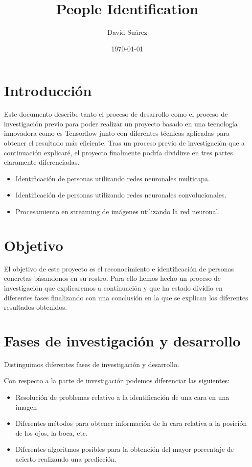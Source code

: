\documentclass{article}
\title{People Identification}
\author{David Suárez}
\date{\today}
\begin{document}
\maketitle

\section{Introducción}
Este documento describe tanto el proceso de desarrollo como el proceso de investigación previo para poder realizar un proyecto basado en una tecnología innovadora como es Tensorflow junto con diferentes técnicas aplicadas para obtener el resultado más eficiente.
Tras un proceso previo de investigación que a continuación explicaré, el proyecto finalmente podría dividirse en tres partes claramente diferenciadas.
\begin{itemize}
\item Identificación de personas utilizando redes neuronales multicapa.
\item Identificación de personas utilizando redes neuronales convolucionales.
\item Procesamiento en streaming de imágenes utilizando la red neuronal.
\end{itemize}

\section{Objetivo}
El objetivo de este proyecto es el reconocimiento e identificación de personas concretas básandonos en su rostro. Para ello hemos hecho un proceso de investigación que explicaremos a continuación y que ha estado dividio en diferentes fases finalizando con una conclusión en la que se explican los diferentes resultados obtenidos.

\section{Fases de investigación y desarrollo}
Distinguimos diferentes fases de investigación y desarrollo.\newline

Con respecto a la parte de investigación podemos diferenciar las siguientes:
\begin{itemize}
\item Resolución de problemas relativo a la identificación de una cara en una imagen
\item Diferentes métodos para obtener información de la cara relativa a la posición de los ojos, la boca, etc.
\item Diferentes algoritmos posibles para la obtención del mayor porcentaje de acierto realizando una predicción.
\end{itemize}
\end{document}
